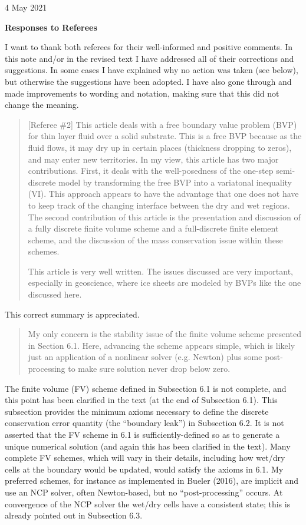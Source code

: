\documentclass[12pt]{amsart}
\newcommand{\mm}{\medskip \noindent}
\begin{document}
\hfill 4 May 2021

\bigskip

\large\centerline{\textbf{Responses to Referees}}
\bigskip
\normalsize

\thispagestyle{empty}

I want to thank both referees for their well-informed and positive comments.  In this note and/or in the revised text I have addressed all of their corrections and suggestions.  In some cases I have explained why no action was taken (see below), but otherwise the suggestions have been adopted.  I have also gone through and made improvements to wording and notation, making sure that this did not change the meaning.

\begin{quote}
[Referee \#2] This article deals with a free boundary value problem (BVP) for thin layer fluid over a solid substrate.  This is a free BVP because as the fluid flows, it may dry up in certain places (thickness dropping to zeros), and may enter new territories.  In my view, this article has two major contributions.  First, it deals with the well-posedness of the one-step semi-discrete model by transforming the free BVP into a variatonal inequality (VI).  This approach appears to have the advantage that one does not have to keep track of the changing interface between the dry and wet regions.  The second contribution of this article is the presentation and discussion of a fully discrete finite volume scheme and a full-discrete finite element scheme, and the discussion of the mass conservation issue within these schemes.

\mm This article is very well written.  The issues discussed are very important, especially in geoscience, where ice sheets are modeled by BVPs like the one discussed here.  
\end{quote}

This correct summary is appreciated.

\begin{quote}
My only concern is the stability issue of the finite volume scheme presented in Section 6.1. Here, advancing the scheme appears simple, which is likely just an application of a nonlinear solver (e.g. Newton) plus some post-processing to make sure solution never drop below zero.
\end{quote}

The finite volume (FV) scheme defined in Subsection 6.1 is not complete, and this point has been clarified in the text (at the end of Subsection 6.1).  This subsection provides the minimum axioms necessary to define the discrete conservation error quantity (the ``boundary leak'') in Subsection 6.2.  It is not asserted that the FV scheme in 6.1 is sufficiently-defined so as to generate a unique numerical solution (and again this has been clarified in the text).  Many complete FV schemes, which will vary in their details, including how wet/dry cells at the boundary would be updated, would satisfy the axioms in 6.1.  My preferred schemes, for instance as implemented in Bueler (2016), are implicit and use an NCP solver, often Newton-based, but no ``post-processing'' occurs.  At convergence of the NCP solver the wet/dry cells have a consistent state; this is already pointed out in Subsection 6.3.
\end{document}
